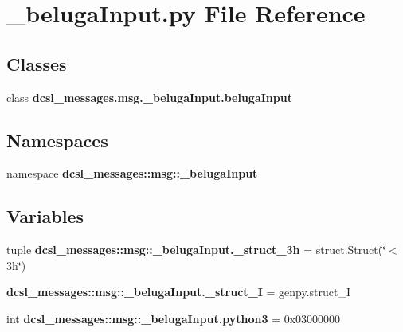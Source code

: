 \section{\-\_\-beluga\-Input.\-py \-File \-Reference}
\label{__belugaInput_8py}
\subsection*{\-Classes}
\begin{DoxyCompactItemize}
\item 
class {\bf dcsl\-\_\-messages.\-msg.\-\_\-beluga\-Input.\-beluga\-Input}
\end{DoxyCompactItemize}
\subsection*{\-Namespaces}
\begin{DoxyCompactItemize}
\item 
namespace {\bf dcsl\-\_\-messages\-::msg\-::\-\_\-beluga\-Input}
\end{DoxyCompactItemize}
\subsection*{\-Variables}
\begin{DoxyCompactItemize}
\item 
tuple {\bf dcsl\-\_\-messages\-::msg\-::\-\_\-beluga\-Input.\-\_\-struct\-\_\-3h} = struct.\-Struct(\char`\"{}$<$3h\char`\"{})
\item 
{\bf dcsl\-\_\-messages\-::msg\-::\-\_\-beluga\-Input.\-\_\-struct\-\_\-\-I} = genpy.\-struct\-\_\-\-I
\item 
int {\bf dcsl\-\_\-messages\-::msg\-::\-\_\-beluga\-Input.\-python3} = 0x03000000
\end{DoxyCompactItemize}
